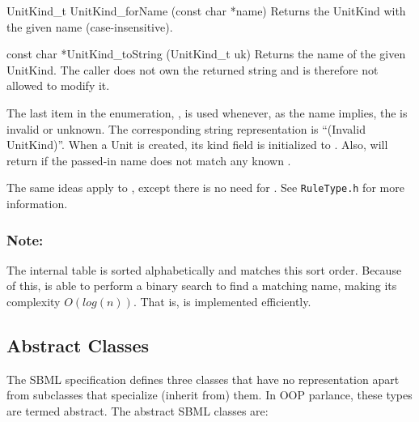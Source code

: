 \documentclass{sbmlmanual}
\begin{document}
\begin{methoddef}{UnitKind\_t UnitKind\_forName (const char *name)}
  Returns the UnitKind with the given name (case-insensitive).
\end{methoddef}

\begin{methoddef}{const char *UnitKind\_toString (UnitKind\_t uk)}
  Returns the name of the given UnitKind.  The caller does not own the
  returned string and is therefore not allowed to modify it.
\end{methoddef}

The last item in the enumeration, , is used
whenever, as the name implies, the  is invalid or
unknown.  The corresponding string representation is ``(Invalid
UnitKind)''.  When a Unit is created, its kind field is initialized to
.  Also,  will
return  if the passed-in name does not
match any known .

The same ideas apply to , except there is no need for
.  See \texttt{RuleType.h} for more
information.

\subsubsection{Note:}

The internal  table is sorted
alphabetically and  matches this sort order.
Because of this,  is able to perform a
binary search to find a matching name, making its complexity
$O(log(n))$.  That is,  is implemented
efficiently.


\subsection{Abstract Classes}
\label{sec:abstract-classes}

The SBML specification defines three classes that have no
representation apart from subclasses that specialize (inherit from)
them.  In OOP parlance, these types are termed abstract.  The abstract
SBML classes are:
\end{document}
